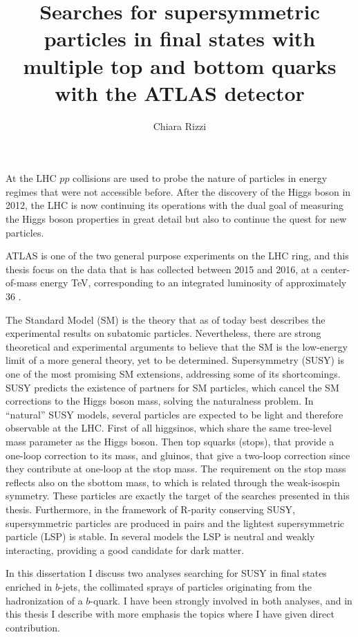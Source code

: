 \documentclass[10pt,a4paper]{article}
\title{Searches for supersymmetric particles in final states with multiple top and bottom quarks with the ATLAS detector}
\author{Chiara Rizzi}
\date{}
\begin{document}
\maketitle

At the LHC $pp$ collisions are used to probe the nature of particles in energy regimes that were not accessible before. 
After the discovery of the Higgs boson in 2012, the LHC is now continuing its operations with the dual goal 
of measuring the Higgs boson properties in great detail but also to continue the quest for new particles.

ATLAS is one of the two general purpose experiments on the LHC ring, and this thesis focus on the data that is has collected between 
2015 and 2016, 
at a center-of-mass energy \cmtre TeV, corresponding to an 
integrated luminosity of approximately 36 \ifb. 

The Standard Model (SM) is the theory that as of today best describes the experimental results on subatomic particles. 
Nevertheless, there are strong theoretical and experimental arguments to believe that the SM is the low-energy limit 
of a more general theory, yet to be determined. 
Supersymmetry (SUSY) is one of the most promising SM extensions, 
addressing some of its shortcomings. SUSY predicts the existence of partners for  
SM particles, which cancel the SM corrections to the Higgs boson mass, solving the naturalness problem. 
In ``natural'' SUSY models, several particles are expected to be light and therefore observable at the LHC.
First of all higgsinos, which share the same tree-level mass parameter as the Higgs boson. 
Then top squarks (stops), that provide a one-loop correction to its mass, and gluinos, that give a two-loop correction since they contribute 
at one-loop at the stop mass. 
The requirement on the stop mass reflects also on the sbottom mass, to which is related through the weak-isospin symmetry. 
These particles are exactly the target of the searches presented in this thesis.
Furthermore, in the framework of R-parity conserving SUSY, supersymmetric particles are produced in pairs and the 
lightest supersymmetric particle (LSP) is stable. 
In several models the LSP is neutral and weakly interacting, providing a good candidate for dark matter.
 

In this dissertation I discuss two analyses searching for SUSY in final states enriched in $b$-jets, the collimated sprays of 
particles originating from the hadronization of a $b$-quark. 
I have been strongly involved in both analyses, 
and in this thesis I describe with more emphasis the topics where I have given direct contribution.
\end{document}
